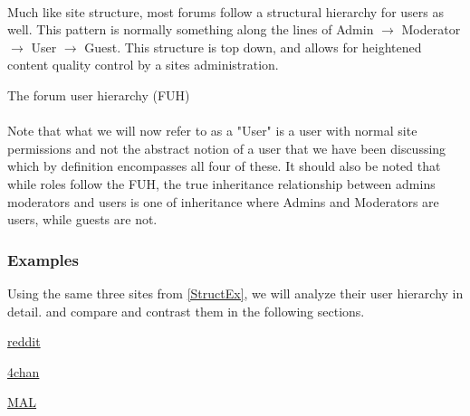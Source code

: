 \documentclass[]{article}
\begin{document}
\begin{minipage}{0.65\textwidth}
\paragraph{}
Much like site structure, most forums follow a structural hierarchy for users as well. This pattern is normally something along the lines of Admin $\to$ Moderator $\to$ User $\to$ Guest. This structure is top down, and allows for heightened content quality control by a sites administration.
\end{minipage}%
\hspace{0.5cm}
\vline
\hspace{0.5cm}
\begin{minipage}{0.35\textwidth}
\vspace{0.5 cm}
The forum user hierarchy (FUH)  
\end{minipage}%

\paragraph{}
Note that what we will now refer to as a "User" is a user with normal site permissions and not the abstract notion of a user that we have been discussing which by definition encompasses all four of these. It should also be noted that while roles follow the FUH, the true inheritance relationship between admins moderators and users is one of inheritance where Admins and Moderators are users, while guests are not.

\subsubsection{Examples}
Using the same three sites from \ref{StructEx}, we will analyze their user hierarchy in detail. and compare and contrast them in the following sections.

\vspace{0.2 cm}
\begin{minipage}{0.4\textwidth}
\hspace{0.3cm}
\href{https://www.reddit.com/}{reddit}
\vspace{0.2 cm}
\end{minipage}%
\vline
\begin{minipage}{0.23\textwidth}
\hspace{0.3cm}
\href{https://www.4channel.org/}{4chan}
\vspace{0.2 cm}
\end{minipage}%
\vline
\begin{minipage}{0.4\textwidth}
\hspace{0.3cm}
\href{https://myanimelist.net/}{MAL}
\vspace{0.2 cm}
\end{minipage}%
\end{document}
